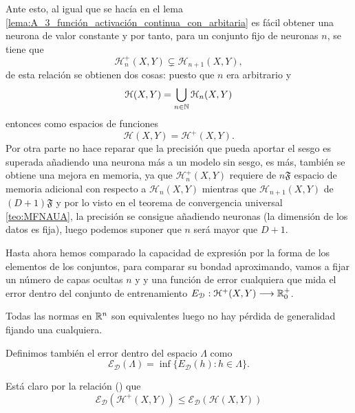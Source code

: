 Ante esto, al igual que se hacía en el lema \ref{lema:A_3_función_activación_continua_con_arbitaria}
es fácil obtener una neurona de valor constante y por tanto, para un conjunto fijo de neuronas $n$, se tiene que 
\begin{equation}
    \mathcal{H}^+_n(X,Y) \subsetneq  \mathcal{H}_{n+1}(X,Y),
\end{equation}
de esta relación se obtienen dos cosas: 
puesto que $n$ era arbitrario y 
\begin{equation}
    \mathcal{H}(X,Y) = \bigcup_{n \in \mathbb{N}} \mathcal{H}_n (X,Y)
\end{equation}
entonces como espacios de funciones 
\begin{equation}
    \mathcal{H}(X,Y) = \mathcal{H}^+ (X,Y).
\end{equation}
Por otra parte no hace reparar que la precisión que pueda aportar el sesgo es
superada añadiendo una neurona más a un modelo sin sesgo, es más, también se obtiene una mejora en memoria, ya que 
$\mathcal{H}^+_n(X,Y)$ requiere de $n \mathfrak{F}$ espacio de memoria adicional con respecto a $\mathcal{H}_n(X,Y)$
mientras que $\mathcal{H}_{n+1}(X,Y)$ de $(D +1) \mathfrak{F}$
y por lo visto en el teorema de convergencia universal \ref{teo:MFNAUA}, la precisión se consigue añadiendo neuronas (la dimensión de los datos es fija),
luego podemos suponer que $n$ será mayor que $D+1$. 

Hasta ahora hemos comparado la capacidad de expresión 
por la forma de los elementos de los conjuntos, para comparar su bondad aproximando, vamos a fijar  un 
 número de capas ocultas $n$ y 
 y una función de error cualquiera que mida el error dentro 
 del conjunto de entrenamiento
 $E_{\mathcal{D}}:\mathcal{H}^+(X,Y) \longrightarrow \mathbb{R}^+_0$.
 
 Todas las normas en $\mathbb{R}^n$ son equivalentes luego no hay pérdida de generalidad fijando una cualquiera.  

 Definimos también el error dentro del espacio $\Lambda$ como 
 \begin{equation}
    \mathcal{E}_{\mathcal{D}} (\Lambda)
    = \inf \{ E_{\mathcal{D}}(h) : h \in \Lambda\}.
 \end{equation}

Está claro por la relación  
 ()
 que 
 \begin{equation}
    \mathcal{E}_{\mathcal{D}}(\mathcal{H}^+(X,Y))
    \leq
    \mathcal{E}_{\mathcal{D}}(\mathcal{H}(X,Y))
 \end{equation}

